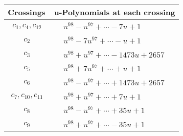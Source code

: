 \documentclass[1p]{elsarticle_modified}
\theoremstyle{definition}
\begin{document}
\begin{tabular}{m{50pt}|m{274pt}}
Crossings & \hspace{64pt}u-Polynomials at each crossing \\
\hline $$\begin{aligned}c_{1},c_{4},c_{12}\end{aligned}$$&$\begin{aligned}
&u^{98}- u^{97}+\cdots-7 u+1
\end{aligned}$\\
\hline $$\begin{aligned}c_{2}\end{aligned}$$&$\begin{aligned}
&u^{98}-7 u^{97}+\cdots- u+1
\end{aligned}$\\
\hline $$\begin{aligned}c_{3}\end{aligned}$$&$\begin{aligned}
&u^{98}+u^{97}+\cdots-1473 u+2657
\end{aligned}$\\
\hline $$\begin{aligned}c_{5}\end{aligned}$$&$\begin{aligned}
&u^{98}+7 u^{97}+\cdots+u+1
\end{aligned}$\\
\hline $$\begin{aligned}c_{6}\end{aligned}$$&$\begin{aligned}
&u^{98}- u^{97}+\cdots+1473 u+2657
\end{aligned}$\\
\hline $$\begin{aligned}c_{7},c_{10},c_{11}\end{aligned}$$&$\begin{aligned}
&u^{98}+u^{97}+\cdots+7 u+1
\end{aligned}$\\
\hline $$\begin{aligned}c_{8}\end{aligned}$$&$\begin{aligned}
&u^{98}- u^{97}+\cdots+35 u+1
\end{aligned}$\\
\hline $$\begin{aligned}c_{9}\end{aligned}$$&$\begin{aligned}
&u^{98}+u^{97}+\cdots-35 u+1
\end{aligned}$\\
\hline
\end{tabular}\\~\\
\end{document}

